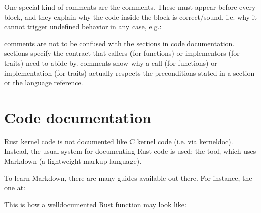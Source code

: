 \documentclass[a4paper,11pt,english]{sphinxmanual}
\begin{document}
One special kind of comments are the  comments. These must appear
before every  block, and they explain why the code inside the block is
correct/sound, i.e. why it cannot trigger undefined behavior in any case, e.g.:

\begin{sphinxVerbatim}[commandchars=\\\{\}]
\end{sphinxVerbatim}

 comments are not to be confused with the  sections
in code documentation.  sections specify the contract that callers
(for functions) or implementors (for traits) need to abide by. 
comments show why a call (for functions) or implementation (for traits) actually
respects the preconditions stated in a  section or the language
reference.


\section{Code documentation}
\label{\detokenize{coding-guidelines:code-documentation}}
Rust kernel code is not documented like C kernel code (i.e. via kernel\sphinxhyphen{}doc).
Instead, the usual system for documenting Rust code is used: the 
tool, which uses Markdown (a lightweight markup language).

To learn Markdown, there are many guides available out there. For instance,
the one at:
\begin{quote}

\end{quote}

This is how a well\sphinxhyphen{}documented Rust function may look like:
\end{document}
